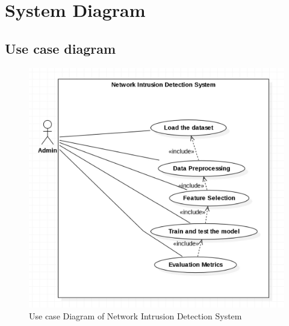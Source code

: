 \section{System Diagram}
\vspace{-18pt}
\subsection{Use case diagram}
\begin{figure}[h]
\begin{center}
	\includegraphics[width=5in]{images/ucd4.jpg} 
	\caption{Use case Diagram of Network Intrusion Detection System} %
	\label{Use case Diagram of Network Intrusion Detection System} %
\end{center}
\end{figure}
\newpage

